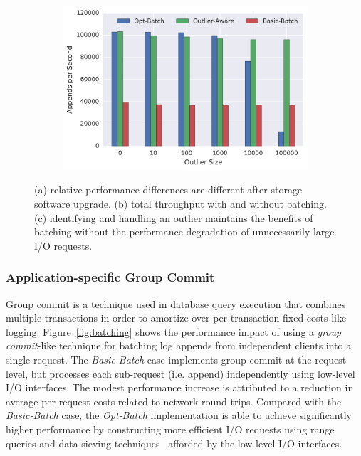 \begin{figure}[t]
\begin{subfigure}[b]{.30\linewidth}
        \includegraphics[width=1.0\linewidth]{batching-outlier-detect.png}
        \caption{}
        \label{fig:batching-outlier}
    \end{subfigure}
    \caption{(a) relative performance differences are different after storage
    software upgrade. (b) total throughput with and without batching. (c)
    identifying and handling an outlier maintains the benefits
    of batching without the performance degradation of unnecessarily large I/O
    requests.}
\end{figure}

\subsubsection{Application-specific Group Commit}
\label{sec:batch}

Group commit is a technique used in database query execution that combines
multiple transactions in order to amortize over per-transaction fixed costs
like logging. Figure~\ref{fig:batching} shows the performance impact of using
a \emph{group commit}-like technique for batching log appends from independent
clients into a single request. The \emph{Basic-Batch} case implements group
commit at the request level, but processes each sub-request (i.e. append)
independently using low-level I/O interfaces. The modest performance increase
is attributed to a reduction in average per-request costs related to network
round-trips. Compared with the \emph{Basic-Batch} case, the \emph{Opt-Batch}
implementation is able to achieve significantly higher performance by
constructing more efficient I/O requests using range queries and data sieving
techniques~\cite{x} afforded by the low-level I/O interfaces.


